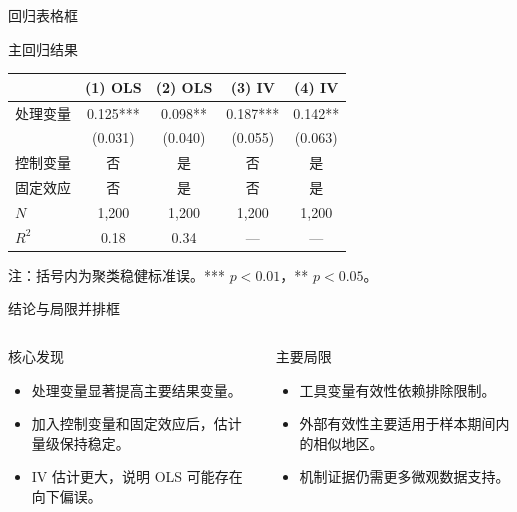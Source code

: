 \begin{frame}{回归表格框}
  \begin{regressionbox}{主回归结果}
    \begin{center}
      \scriptsize
      \begin{tabular}{lcccc}
        \toprule
        & (1) OLS & (2) OLS & (3) IV & (4) IV \\
        \midrule
        处理变量 & 0.125*** & 0.098** & 0.187*** & 0.142** \\
                 & (0.031)  & (0.040) & (0.055)  & (0.063) \\
        控制变量 & 否 & 是 & 否 & 是 \\
        固定效应 & 否 & 是 & 否 & 是 \\
        $N$      & 1{,}200 & 1{,}200 & 1{,}200 & 1{,}200 \\
        $R^2$    & 0.18 & 0.34 & --- & --- \\
        \bottomrule
      \end{tabular}
    \end{center}
    {\tiny 注：括号内为聚类稳健标准误。*** $p<0.01$，** $p<0.05$。}
  \end{regressionbox}
\end{frame}

\begin{frame}{结论与局限并排框}
  \begin{columns}[T]
      \begin{findingbox}{核心发现}
        \begin{itemize}
          \item 处理变量显著提高主要结果变量。
          \item 加入控制变量和固定效应后，估计量级保持稳定。
          \item IV 估计更大，说明 OLS 可能存在向下偏误。
        \end{itemize}
      \end{findingbox}
      \begin{cautionbox}{主要局限}
        \begin{itemize}
          \item 工具变量有效性依赖排除限制。
          \item 外部有效性主要适用于样本期间内的相似地区。
          \item 机制证据仍需更多微观数据支持。
        \end{itemize}
      \end{cautionbox}
  \end{columns}
\end{frame}


